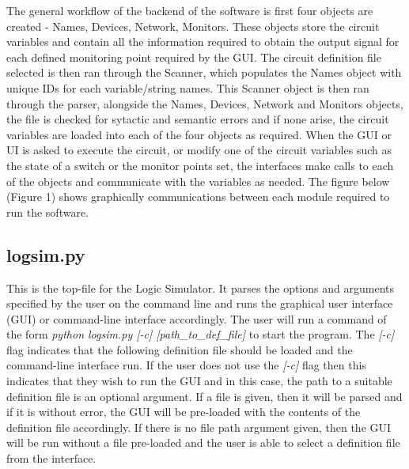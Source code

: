 \documentclass{article}					%
\begin{document}
The general workflow of the backend of the software is first four objects are created - Names, Devices, Network, Monitors. These objects store the circuit variables and contain all the information required to obtain the output signal for each defined monitoring point required by the GUI. The circuit definition file selected is then ran through the Scanner, which populates the Names object with unique IDs for each variable/string names. This Scanner object is then ran through the parser, alongside the Names, Devices, Network and Monitors objects, the file is checked for sytactic and semantic errors and if none arise, the circuit variables are loaded into each of the four objects as required. When the GUI or UI is asked to execute the circuit, or modify one of the circuit variables such as the state of a switch or the monitor points set, the interfaces make calls to each of the objects and communicate with the variables as needed. The figure below (Figure 1) shows graphically communications between each module required to run the software.

\begin{figure}[h!]
\begin{centering}
\texttt{[image: \{"dependencies\_graph"]}.JPG}
\caption{Graph showing the layout of modules in the Logic Simulator}
\end{centering}
\end{figure}

\subsection{logsim.py}
This is the top-file for the Logic Simulator. It parses the options and arguments specified by the user on the command line and runs the graphical user interface (GUI) or command-line interface accordingly. The user will run a command of the form \textit{python logsim.py [-c] [path\_to\_def\_file]} to start the program. The \textit{[-c]} flag indicates that the following definition file should be loaded and the command-line interface run. If the user does not use the \textit{[-c]} flag then this indicates that they wish to run the GUI and in this case, the path to a suitable definition file is an optional argument. If a file is given, then it will be parsed and if it is without error, the GUI will be pre-loaded with the contents of the definition file accordingly. If there is no file path argument given, then the GUI will be run without a file pre-loaded and the user is able to select a definition file from the interface.
\end{document}
